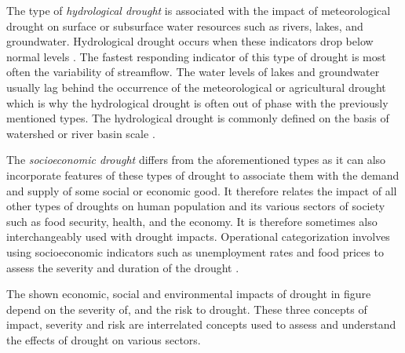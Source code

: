{The type of \textit{hydrological drought} is associated with the impact of meteorological drought on surface or subsurface water resources such as rivers, lakes, and groundwater. Hydrological drought occurs when these indicators drop below normal levels \autocite{palmerMeteorologicalDrought1965}. The fastest responding indicator of this type of drought is most often the variability of streamflow. The water levels of lakes and groundwater usually lag behind the occurrence of the meteorological or agricultural drought which is why the hydrological drought is often out of phase with the previously mentioned types. The hydrological drought is commonly defined on the basis of watershed or river basin scale \autocite{baltiReviewDroughtMonitoring2020,nationaldroughtmitigationcenterTypesDrought,wilhiteUnderstandingDroughtPhenomenon1985}.

The \textit{socioeconomic drought} differs from the aforementioned types as it can also incorporate features of these types of drought to associate them with the demand and supply of some social or economic good. It therefore relates the impact of all other types of droughts on human population and its various sectors of society such as food security, health, and the economy. It is therefore sometimes also interchangeably used with drought impacts. Operational categorization involves using socioeconomic indicators such as unemployment rates and food prices to assess the severity and duration of the drought \autocite{nationaldroughtmitigationcenterTypesDrought,wilhiteUnderstandingDroughtPhenomenon1985}.


The shown economic, social and environmental impacts of drought in figure  depend on the severity of, and the risk to drought. These three concepts of impact, severity and risk are interrelated concepts used to assess and understand the effects of drought on various sectors. 


}
